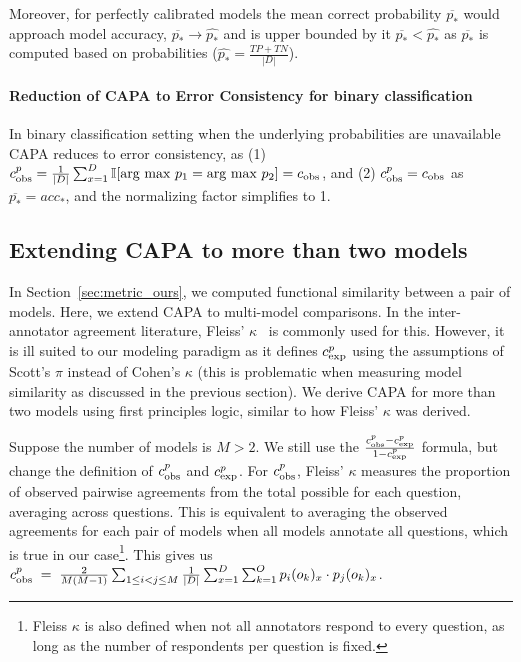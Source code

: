  Moreover, for perfectly calibrated models the mean correct probability $\overline{p_*}$ would approach model accuracy, $\overline{p_*} \rightarrow \hat{p_*} $ and is upper bounded by it $\overline{p_*} < \hat{p_*}$ as $\overline{p_*}$ is computed based on probabilities ($\hat{p_*}=\frac{TP+TN}{|D|}$). 

 
\paragraph{Reduction of CAPA to Error Consistency for binary classification}
\label{sec:kappareduction}
In binary classification setting when the underlying probabilities are unavailable CAPA reduces to error consistency, as (1) $c_{\text{obs}}^{p} = \frac{1}{|D|}\sum_{x=1}^D \mathbb{I}[\text{arg max }p_1 =\text{arg max }p_2] = c_{\text{obs}}$, and (2) $c_{\text{obs}}^{p} = c_{\text{obs}}$ as $\overline{p_*}=acc_*$, and the normalizing factor simplifies to 1. 


\subsection{Extending CAPA to more than two models}
\label{app:metric_multi}
In Section~\ref{sec:metric_ours}, we computed functional similarity between a pair of models. Here, we extend CAPA to multi-model comparisons. In the inter-annotator agreement literature, Fleiss' $\kappa$~\citep{fleiss1981measurement} is commonly used for this. However, it is ill suited to our modeling paradigm as it defines $c_{\text{exp}}^{p}$ using the assumptions of Scott's $\pi$ instead of Cohen's $\kappa$ (this is problematic when measuring model similarity as discussed in the previous section). We derive CAPA for more than two models using first principles logic, similar to how Fleiss' $\kappa$ was derived.

Suppose the number of models is $M>2$. We still use the $\frac{c_{\text{obs}}^{p} - c_{\text{exp}}^{p}}{1 - c_{\text{exp}}^{p}}$ formula, but change the definition of $c_{\text{obs}}^{p}$ and $c_{\text{exp}}^{p}$. For $c_{\text{obs}}^{p}$, Fleiss' $\kappa$ measures the proportion of observed pairwise agreements from the total possible for each question, averaging across questions. This is equivalent to averaging the observed agreements for each pair of models when all models annotate all questions, which is true in our case\footnote{Fleiss $\kappa$ is also defined when not all annotators respond to every question, as long as the number of respondents per question is fixed.}. This gives us $c_{\text{obs}}^{p} \;=\; \frac{2}{M(M-1)} \sum_{1 \leq i < j \leq M} \frac{1}{|D|} \sum_{x=1}^D \sum_{k=1}^O p_i(o_k)_x \cdot p_j(o_k)_x$. 

